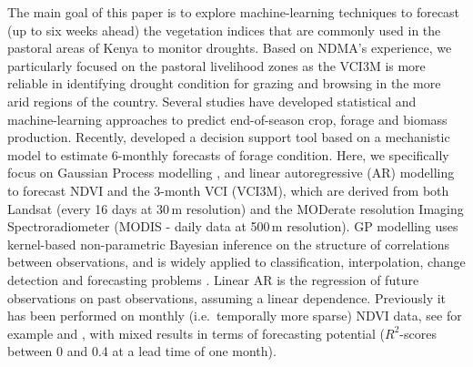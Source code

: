 \documentclass[review]{elsarticle}
\begin{document}

The main goal of this paper is to explore machine-learning techniques to forecast (up to six weeks ahead) the vegetation indices that are commonly used in the pastoral areas of Kenya to monitor droughts. Based on NDMA's experience, we particularly focused on the pastoral livelihood zones as the VCI3M is more reliable in identifying drought condition for grazing and browsing in the more arid regions of the country.  Several studies have developed statistical and machine-learning approaches \citep{udelhoven,meroni2014early,Zambrano:2018,vrieling2016early} to predict end-of-season crop, forage and biomass production. Recently, \cite{matere2019predictive} developed a decision support tool based on a mechanistic model to estimate 6-monthly forecasts of forage condition. Here, we specifically focus on Gaussian Process modelling \cite[GP,][]{gpm}, and linear autoregressive (AR) modelling \citep[e.g.][]{Hamilton94} to forecast NDVI and the 3-month VCI (VCI3M), which are derived from both Landsat (every 16 days at 30\,m resolution) and the MODerate resolution Imaging Spectroradiometer (MODIS - daily data at 500\,m resolution). GP modelling uses kernel-based non-parametric Bayesian inference on the structure of correlations between observations, and is widely applied to classification, interpolation, change detection and forecasting problems \citep{955315,Chandola2010SCALABLETS,7487896,rs11050481}. %
Linear AR is the regression of future observations on past observations, assuming a linear dependence. Previously it has been performed on monthly (i.e.~temporally more sparse) NDVI data, see for example \cite{Asoka:2015} and \cite{Papagiannopoulou}, with mixed results in terms of forecasting potential ($R^2$-scores between 0 and 0.4 at a lead time of one month). 
\end{document}
